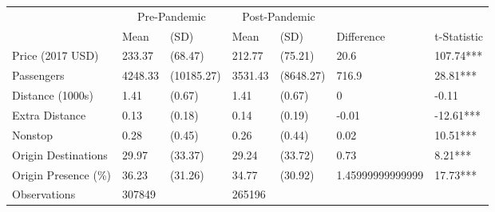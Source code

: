 
\begin{tabular}[t]{lllllll}
\toprule
\multicolumn{1}{c}{ } & \multicolumn{2}{c}{Pre-Pandemic} & \multicolumn{2}{c}{Post-Pandemic} & \multicolumn{2}{c}{ } \\
\cmidrule(l{3pt}r{3pt}){2-3} \cmidrule(l{3pt}r{3pt}){4-5}
 & Mean & (SD) & Mean & (SD) & Difference & t-Statistic\\
\midrule
Price (2017 USD) & 233.37 & (68.47) & 212.77 & (75.21) & 20.6 & 107.74***\\
Passengers & 4248.33 & (10185.27) & 3531.43 & (8648.27) & 716.9 & 28.81***\\
Distance (1000s) & 1.41 & (0.67) & 1.41 & (0.67) & 0 & -0.11\\
Extra Distance & 0.13 & (0.18) & 0.14 & (0.19) & -0.01 & -12.61***\\
Nonstop & 0.28 & (0.45) & 0.26 & (0.44) & 0.02 & 10.51***\\
\addlinespace
Origin Destinations & 29.97 & (33.37) & 29.24 & (33.72) & 0.73 & 8.21***\\
Origin Presence (\%) & 36.23 & (31.26) & 34.77 & (30.92) & 1.45999999999999 & 17.73***\\
Observations & 307849 &  & 265196 &  &  & \\
\bottomrule
\end{tabular}
